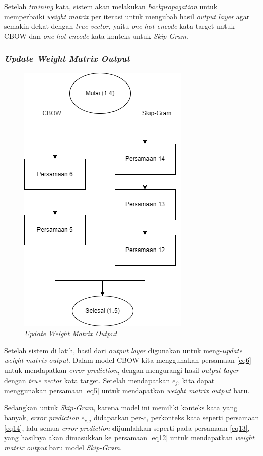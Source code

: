 \documentclass[12pt]{report}
\begin{document}
Setelah \textit{training} kata, sistem akan melakukan \textit{backpropagation} untuk memperbaiki \textit{weight matrix} per iterasi untuk mengubah hasil \textit{output layer} agar semakin dekat dengan \textit{true vector}, yaitu \textit{one-hot encode} kata target untuk CBOW dan \textit{one-hot encode} kata konteks untuk \textit{Skip-Gram}.

\subsubsection{\textit{Update Weight Matrix Output}}
\begin{figure}[H]
\centering
\includegraphics[scale=0.75]{updateweightoutputrev2}
\caption{\textit{Update Weight Matrix Output}}
\label{updateweightoutput}
\end{figure}
Setelah sistem di latih, hasil dari \textit{output layer} digunakan untuk meng-\textit{update weight matrix output}. Dalam model CBOW kita menggunakan persamaan \eqref{eq6} untuk mendapatkan \textit{error prediction}, dengan mengurangi hasil \textit{output layer} dengan \textit{true vector} kata target. Setelah mendapatkan $e_j$, kita dapat menggunakan persamaan \eqref{eq5} untuk mendapatkan \textit{weight matrix output} baru. 

Sedangkan untuk \textit{Skip-Gram}, karena model ini memiliki konteks kata yang banyak, \textit{error prediction} $e_{c,j}$ didapatkan per-$c$, perkonteks kata seperti persamaan \eqref{eq14}, lalu semua \textit{error prediction} dijumlahkan seperti pada persamaan \eqref{eq13}, yang hasilnya akan dimasukkan ke persamaan \eqref{eq12} untuk mendapatkan \textit{weight matrix output} baru model \textit{Skip-Gram}.
\end{document}
